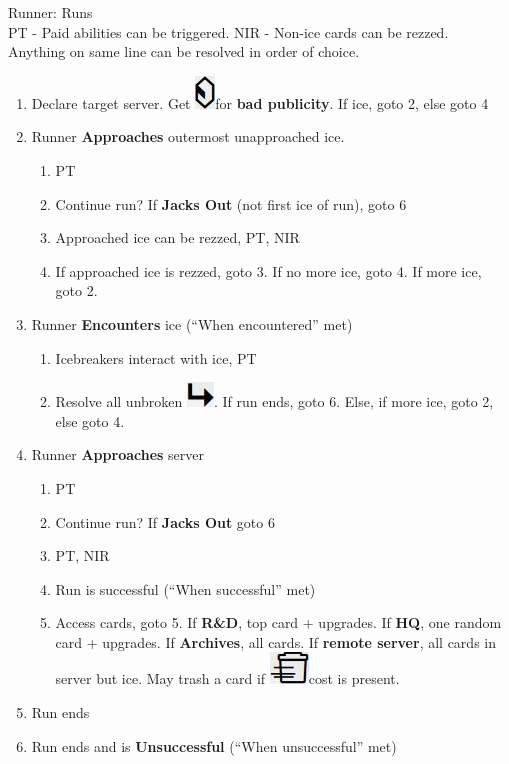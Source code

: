 \documentclass[12pt]{article}
\newenvironment{enumerateCustom}
{\begin{enumerate}
  \setlength{\itemsep}{1pt}
  \setlength{\parskip}{0pt}
  \setlength{\parsep}{0pt}}
{\end{enumerate}}
\newcommand{\credit}{\includegraphics[scale=0.40]{images/creditLarge.jpg}\hspace{0.3em}}
\newcommand{\subroutineNoSpace}{\includegraphics[scale=0.40]{images/subroutineLarge.jpg}}
\newcommand{\trash}{\includegraphics[scale=0.40]{images/trashLarge.jpg}\hspace{0.3em}}
\begin{document}
\begin{multicols*}{2}
Runner: Runs
\\PT - Paid abilities can be triggered. NIR - Non-ice cards can be rezzed.\\
Anything on same line can be resolved in order of choice.
\begin{enumerateCustom}
	\item Declare target server. Get \credit for \textbf{bad publicity}. If ice, goto 2, else goto 4
	\item Runner \textbf{Approaches} outermost unapproached ice.
		\begin{enumerateCustom}
			\item PT
			\item Continue run? If \textbf{Jacks Out} (not first ice of run), goto 6
			\item Approached ice can be rezzed, PT, NIR
			\item If approached ice is rezzed, goto 3. If no more ice, goto 4. If more ice, goto 2.
		\end{enumerateCustom}
	\item Runner \textbf{Encounters} ice (``When encountered'' met)
		\begin{enumerateCustom}
			\item Icebreakers interact with ice, PT
			\item Resolve all unbroken \subroutineNoSpace. If run ends, goto 6. Else, if more ice, goto 2, else goto 4.
		\end{enumerateCustom}
	\item Runner \textbf{Approaches} server
		\begin{enumerateCustom}
			\item PT
			\item Continue run? If \textbf{Jacks Out} goto 6
			\item PT, NIR
			\item Run is successful (``When successful'' met)
			\item Access cards, goto 5. If \textbf{R\&D}, top card + upgrades. If \textbf{HQ}, one random card + upgrades. If \textbf{Archives}, all cards. If \textbf{remote server}, all cards in server but ice. May trash a card if \trash cost is present.
		\end{enumerateCustom}
	\item Run ends
	\item Run ends and is \textbf{Unsuccessful} (``When unsuccessful'' met)
\end{enumerateCustom}


\end{multicols*}
\end{document}
